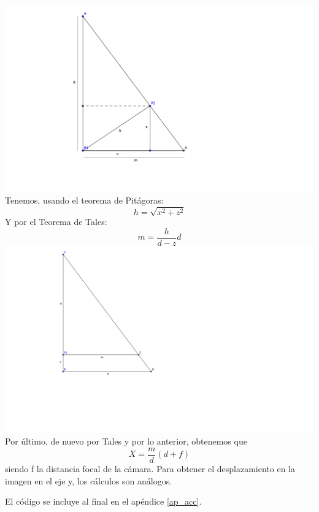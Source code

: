 \documentclass[a4paper,openright, 12pt]{book}
\begin{document}
\includegraphics{tales1}
\newpage
Tenemos, usando el teorema de Pitágoras:
\begin{equation*}
h=\sqrt{x^2 + z^2}
\end{equation*}
Y por el Teorema de Tales:
\begin{equation*}
m = \dfrac{h}{d-z}d
\end{equation*}
\includegraphics{tales2}
Por último, de nuevo por Tales y por lo anterior, obtenemos que
\begin{equation*}
X=\dfrac{m}{d}(d+f)
\end{equation*}
siendo f la distancia focal de la cámara.
Para obtener el desplazamiento en la imagen en el eje y, los cálculos son análogos.

El código se incluye al final en el apéndice \ref{ap_acc}.
\newpage
\end{document}
